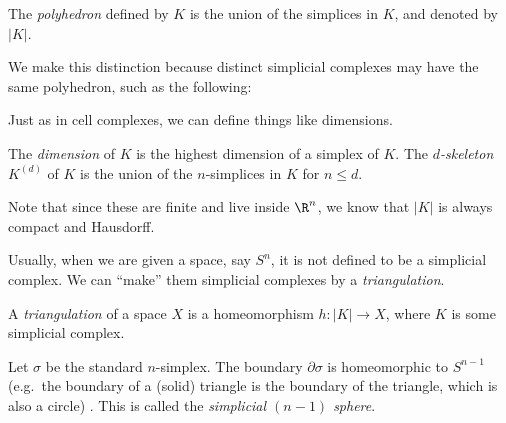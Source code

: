 \documentclass[a4paper]{article}
\begin{document}
\begin{defi}[Polyhedron]
  The \emph{polyhedron} defined by $K$ is the union of the simplices in $K$, and denoted by $|K|$.
\end{defi}
We make this distinction because distinct simplicial complexes may have the same polyhedron, such as the following:
\begin{center}
\end{center}
Just as in cell complexes, we can define things like dimensions.
\begin{defi}
  The \emph{dimension} of $K$ is the highest dimension of a simplex of $K$. The \emph{$d$-skeleton} $K^{(d)}$ of $K$ is the union of the $n$-simplices in $K$ for $n \leq d$.
\end{defi}
Note that since these are finite and live inside $\R^n$, we know that $|K|$ is always compact and Hausdorff.

Usually, when we are given a space, say $S^n$, it is not defined to be a simplicial complex. We can ``make'' them simplicial complexes by a \emph{triangulation}.
\begin{defi}[Triangulation]
  A \emph{triangulation} of a space $X$ is a homeomorphism $h: |K| \to X$, where $K$ is some simplicial complex.
\end{defi}

\begin{eg}
  Let $\sigma$ be the standard $n$-simplex. The boundary $\partial \sigma$ is homeomorphic to $S^{n - 1}$ (e.g.\ the boundary of a (solid) triangle is the boundary of the triangle, which is also a circle) . This is called the \emph{simplicial $(n - 1)$ sphere}.
\end{eg}
\end{document}
